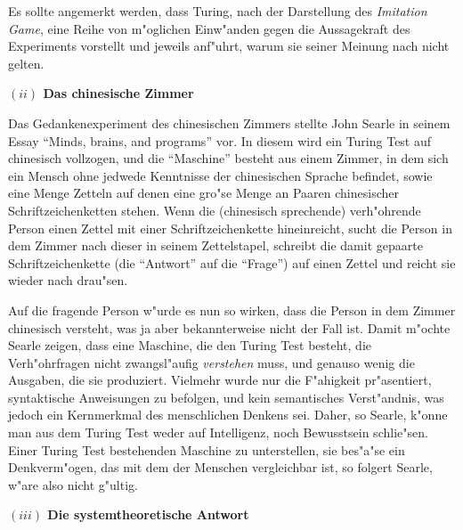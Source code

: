 \documentclass[a4paper, emulatestandardclasses, 12pt]{scrartcl}
\begin{document}
\begin{onehalfspace}
Es sollte angemerkt werden, dass Turing, nach der Darstellung des \emph{Imitation Game}, eine Reihe von m"oglichen Einw"anden gegen die Aussagekraft des Experiments vorstellt und jeweils anf"uhrt, warum sie seiner Meinung nach nicht gelten. %

\vspace{5mm}
\noindent\textbf{$(ii)$ Das chinesische Zimmer}

\noindent Das Gedankenexperiment des chinesischen Zimmers stellte John Searle in seinem Essay "`Minds, brains, and programs"' vor. In diesem wird ein Turing Test auf chinesisch vollzogen, und die "`Maschine"' besteht aus einem Zimmer, in dem sich ein Mensch ohne jedwede Kenntnisse der chinesischen Sprache befindet, sowie eine Menge Zetteln auf denen eine gro"se Menge an Paaren chinesischer Schriftzeichenketten stehen. Wenn die (chinesisch sprechende) verh"ohrende Person einen Zettel mit einer Schriftzeichenkette hineinreicht, sucht die Person in dem Zimmer nach dieser in seinem Zettelstapel, schreibt die damit gepaarte Schriftzeichenkette (die "`Antwort"' auf die "`Frage"') auf einen Zettel und reicht sie wieder nach drau"sen. 

Auf die fragende Person w"urde es nun so wirken, dass die Person in dem Zimmer chinesisch versteht, was ja aber bekannterweise nicht der Fall ist. Damit m"ochte Searle zeigen, dass eine Maschine, die den Turing Test besteht, die Verh"ohrfragen nicht zwangsl"aufig \emph{verstehen} muss, und genauso wenig die Ausgaben, die sie produziert. Vielmehr wurde nur die F"ahigkeit pr"asentiert, syntaktische Anweisungen zu befolgen, und kein semantisches Verst"andnis, was jedoch ein Kernmerkmal des menschlichen Denkens sei. Daher, so Searle, k"onne man aus dem Turing Test weder auf Intelligenz, noch Bewusstsein schlie"sen. Einer Turing Test bestehenden Maschine zu unterstellen, sie bes"a"se ein Denkverm"ogen, das mit dem der Menschen vergleichbar ist, so folgert Searle, w"are also nicht g"ultig. 

\vspace{5mm}
\noindent\textbf{$(iii)$ Die systemtheoretische Antwort}

\noindent


 

\end{onehalfspace}
\end{document}
